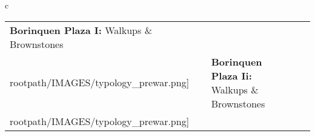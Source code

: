 \begin{table}[H]
        \begin{tabular}{c}
        \begin{tabular}{m{1.25in} m{2in} m{.1in} m{1.25in} m{2in}}
\textbf{Borinquen Plaza I:} {Walkups \& Brownstones} & \texttt{[image: \\rootpath/IMAGES/typology\_prewar.png]} & & \textbf{Borinquen Plaza Ii:} {Walkups \& Brownstones} & \texttt{[image: \\rootpath/IMAGES/typology\_prewar.png]}
\end{tabular}\end{tabular}
        \end{table}
